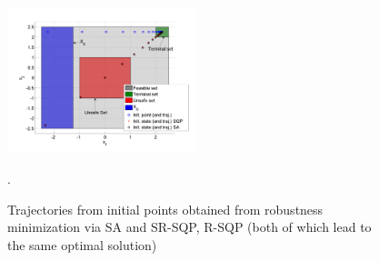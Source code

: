 \begin{figure}[t]
\centering
\includegraphics[width=0.49\textwidth]{figures/ToyExampleFalse}
\vspace{-30pt}
\caption{{\small Trajectories from initial points obtained from robustness minimization via SA and SR-SQP, R-SQP (both of which lead to the same optimal solution)}}.
\label{fig:toy falisification}
\vspace{-20pt}
\end{figure}
